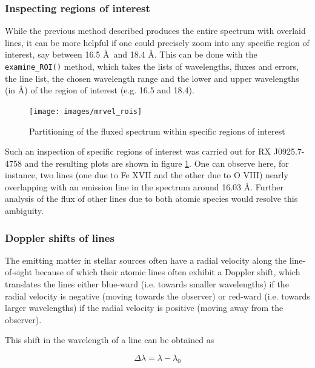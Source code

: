             \subsubsection{Inspecting regions of interest} \label{tool:rgs-files:demonstration:roi}
                While the previous method described produces the entire spectrum with overlaid lines, it can be more helpful if one could precisely zoom into any specific region of interest, say between 16.5 \AA~and 18.4 \AA. This can be done with the \texttt{examine\_ROI()} method, which takes the lists of wavelengths, fluxes and errors, the line list, the chosen wavelength range and the lower and upper wavelengths (in \AA) of the region of interest (e.g. 16.5 and 18.4).
                
                \begin{figure}[h!]
    				\centering
    				\texttt{[image: images/mrvel\_rois]}
    				\caption{Partitioning of the fluxed spectrum within specific regions of interest}
    				\label{fig:roi}
			    \end{figure}
                
                Such an inspection of specific regions of interest was carried out for RX J0925.7-4758 and the resulting plots are shown in figure \ref{fig:roi}. One can observe here, for instance, two lines (one due to Fe XVII and the other due to O VIII) nearly overlapping with an emission line in the spectrum around 16.03  \AA. Further analysis of the flux of other lines due to both atomic species would resolve this ambiguity.
                
            \subsubsection{Doppler shifts of lines} \label{tool:rgs-files:demonstration:doppler}
                The emitting matter in stellar sources often have a radial velocity along the line-of-sight because of which their atomic lines often exhibit a Doppler shift, which translates the lines either blue-ward (i.e. towards smaller wavelengths) if the radial velocity is negative (moving towards the observer) or red-ward (i.e. towards larger wavelengths) if the radial velocity is positive (moving away from the observer).
                
                This shift in the wavelength of a line can be obtained as
                
                \begin{equation}
                    \Delta\lambda=\lambda-\lambda_0 \label{eqn-doppler-02}
                \end{equation}
                
